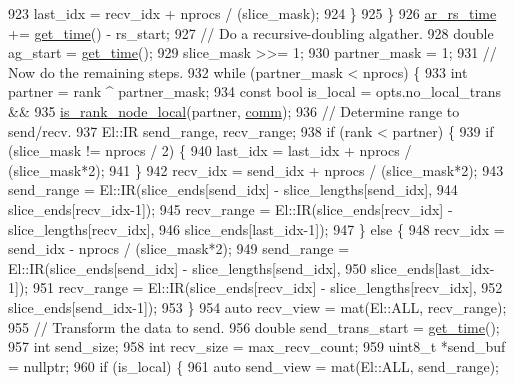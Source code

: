 \begin{DoxyCode}
923       last\_idx = recv\_idx + nprocs / (slice\_mask);
924     \}
925   \}
926   \hyperlink{classlbann_1_1lbann__comm_a85022d803e339eb14a15129a07876c2b}{ar\_rs\_time} += \hyperlink{namespacelbann_a478d36031ff0659893c4322cd856157f}{get\_time}() - rs\_start;
927   \textcolor{comment}{// Do a recursive-doubling algather.}
928   \textcolor{keywordtype}{double} ag\_start = \hyperlink{namespacelbann_a478d36031ff0659893c4322cd856157f}{get\_time}();
929   slice\_mask >>= 1;
930   partner\_mask = 1;
931   \textcolor{comment}{// Now do the remaining steps.}
932   \textcolor{keywordflow}{while} (partner\_mask < nprocs) \{
933     \textcolor{keywordtype}{int} partner = rank ^ partner\_mask;
934     \textcolor{keyword}{const} \textcolor{keywordtype}{bool} is\_local = opts.no\_local\_trans &&
935                           \hyperlink{classlbann_1_1lbann__comm_a5cdd318d1505ba0f31bf4fe9fadffacc}{is\_rank\_node\_local}(partner, \hyperlink{file__io_8cpp_ab048c6f9fcbcfaa57ce68b00263dbebe}{comm});
936     \textcolor{comment}{// Determine range to send/recv.}
937     El::IR send\_range, recv\_range;
938     \textcolor{keywordflow}{if} (rank < partner) \{
939       \textcolor{keywordflow}{if} (slice\_mask != nprocs / 2) \{
940         last\_idx = last\_idx + nprocs / (slice\_mask*2);
941       \}
942       recv\_idx = send\_idx + nprocs / (slice\_mask*2);
943       send\_range = El::IR(slice\_ends[send\_idx] - slice\_lengths[send\_idx],
944                           slice\_ends[recv\_idx-1]);
945       recv\_range = El::IR(slice\_ends[recv\_idx] - slice\_lengths[recv\_idx],
946                           slice\_ends[last\_idx-1]);
947     \} \textcolor{keywordflow}{else} \{
948       recv\_idx = send\_idx - nprocs / (slice\_mask*2);
949       send\_range = El::IR(slice\_ends[send\_idx] - slice\_lengths[send\_idx],
950                           slice\_ends[last\_idx-1]);
951       recv\_range = El::IR(slice\_ends[recv\_idx] - slice\_lengths[recv\_idx],
952                           slice\_ends[send\_idx-1]);
953     \}
954     \textcolor{keyword}{auto} recv\_view = mat(El::ALL, recv\_range);
955     \textcolor{comment}{// Transform the data to send.}
956     \textcolor{keywordtype}{double} send\_trans\_start = \hyperlink{namespacelbann_a478d36031ff0659893c4322cd856157f}{get\_time}();
957     \textcolor{keywordtype}{int} send\_size;
958     \textcolor{keywordtype}{int} recv\_size = max\_recv\_count;
959     uint8\_t *send\_buf = \textcolor{keyword}{nullptr};
960     \textcolor{keywordflow}{if} (is\_local) \{
961       \textcolor{keyword}{auto} send\_view = mat(El::ALL, send\_range);

\end{DoxyCode}
